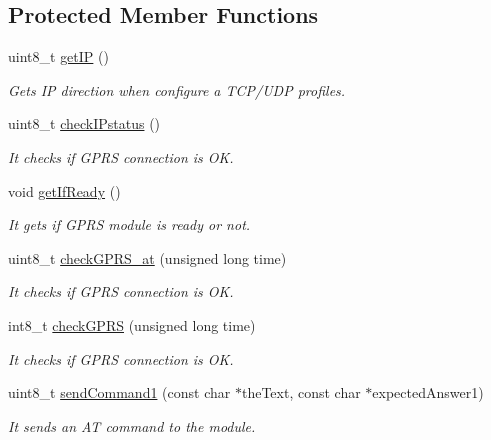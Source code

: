 \subsection*{Protected Member Functions}
\begin{DoxyCompactItemize}
\item 
uint8\+\_\+t \hyperlink{class_wasp_g_p_r_s___pro__core_ae8192bccff86aba09c59405fbe60ce13}{get\+IP} ()
\begin{DoxyCompactList}\small\item\em Gets IP direction when configure a T\+C\+P/\+U\+DP profiles. \end{DoxyCompactList}\item 
uint8\+\_\+t \hyperlink{class_wasp_g_p_r_s___pro__core_a2c652de61ad43bf2b70820b84d54cac0}{check\+I\+Pstatus} ()
\begin{DoxyCompactList}\small\item\em It checks if G\+P\+RS connection is OK. \end{DoxyCompactList}\item 
void \hyperlink{class_wasp_g_p_r_s___pro__core_a9f8732589d29be63d986b1dd7d57e50c}{get\+If\+Ready} ()
\begin{DoxyCompactList}\small\item\em It gets if G\+P\+RS module is ready or not. \end{DoxyCompactList}\item 
uint8\+\_\+t \hyperlink{class_wasp_g_p_r_s___pro__core_a44720043bbc78c8183e128f7ddba6509}{check\+G\+P\+R\+S\+\_\+at} (unsigned long time)
\begin{DoxyCompactList}\small\item\em It checks if G\+P\+RS connection is OK. \end{DoxyCompactList}\item 
int8\+\_\+t \hyperlink{class_wasp_g_p_r_s___pro__core_a8bcdd6d37c050d7a700059dc1f46c835}{check\+G\+P\+RS} (unsigned long time)
\begin{DoxyCompactList}\small\item\em It checks if G\+P\+RS connection is OK. \end{DoxyCompactList}\item 
uint8\+\_\+t \hyperlink{class_wasp_g_p_r_s___pro__core_a19cbdbee2c77861de9ddbac98387dde3}{send\+Command1} (const char $\ast$the\+Text, const char $\ast$expected\+Answer1)
\begin{DoxyCompactList}\small\item\em It sends an AT command to the module. \end{DoxyCompactList}\item 

\end{DoxyCompactItemize}
